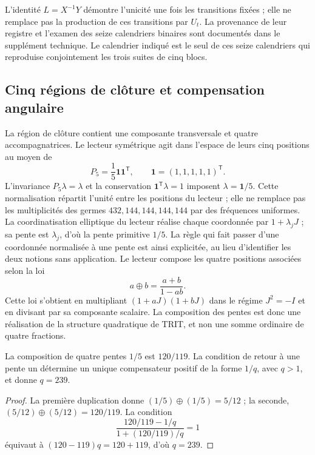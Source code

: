 L'identité \(L=X^{-1}Y\) démontre l'unicité une fois les transitions fixées ; elle ne remplace pas la production de ces transitions par \(U_t\). La provenance de leur registre et l'examen des seize calendriers binaires sont documentés dans le supplément technique. Le calendrier indiqué est le seul de ces seize calendriers qui reproduise conjointement les trois suites de cinq blocs.

\subsection{Cinq régions de clôture et compensation angulaire}

La région de clôture contient une composante transversale et quatre accompagnatrices. Le lecteur symétrique agit dans l'espace de leurs cinq positions au moyen de
\[
 P_5=\frac15\mathbf1\mathbf1^{\mathsf T},\qquad
 \mathbf1=(1,1,1,1,1)^{\mathsf T}.
\]
L'invariance \(P_5\lambda=\lambda\) et la conservation \(\mathbf1^{\mathsf T}\lambda=1\) imposent \(\lambda=\mathbf1/5\). Cette normalisation répartit l'unité entre les positions du lecteur ; elle ne remplace pas les multiplicités des germes \(432,144,144,144,144\) par des fréquences uniformes. La coordinatisation elliptique du lecteur réalise chaque coordonnée par \(1+\lambda_jJ\) ; sa pente est \(\lambda_j\), d'où la pente primitive \(1/5\). La règle qui fait passer d'une coordonnée normalisée à une pente est ainsi explicitée, au lieu d'identifier les deux notions sans application. Le lecteur compose les quatre positions associées selon la loi
\begin{equation}
 a\oplus b=\frac{a+b}{1-ab}.
 \label{eq:suma-pendientes}
\end{equation}
Cette loi s'obtient en multipliant \((1+aJ)(1+bJ)\) dans le régime \(J^2=-I\) et en divisant par sa composante scalaire. La composition des pentes est donc une réalisation de la structure quadratique de TRIT, et non une somme ordinaire de quatre fractions.

\begin{proposition}
La composition de quatre pentes \(1/5\) est \(120/119\). La condition de retour à une pente un détermine un unique compensateur positif de la forme \(1/q\), avec \(q>1\), et donne \(q=239\).
\end{proposition}
\begin{proof}
La première duplication donne \((1/5)\oplus(1/5)=5/12\) ; la seconde, \((5/12)\oplus(5/12)=120/119\). La condition
\[
 \frac{120/119-1/q}{1+(120/119)/q}=1
\]
équivaut à \((120-119)q=120+119\), d'où \(q=239\).
\end{proof}

